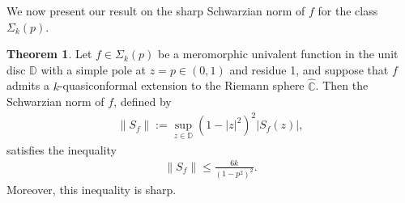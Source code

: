 \documentclass[a4paper,12pt]{amsart}
\theoremstyle{plain}
\theoremstyle{definition}
\newtheorem{thm}{Theorem}[section]
\begin{document}
We now present our result on the sharp Schwarzian norm of $f$ for the class $\Sigma_k(p)$.
\begin{thm}\label{Th-1.3}
Let $f \in \Sigma_k(p)$ be a meromorphic univalent function in the unit disc $\mathbb{D}$ with a simple pole at $z = p \in (0,1)$ and residue 1, and suppose that $f$ admits a $k$-quasiconformal extension to the Riemann sphere $\widehat{\mathbb{C}}$. Then the Schwarzian norm of $f$, defined by
\begin{align*}
	\|S_f\| := \sup_{z \in \mathbb{D}} (1 - |z|^2)^2 |S_f(z)|,
\end{align*}
satisfies the inequality
\begin{align*}
	\|S_f\| \leq \frac{6k}{(1 - p^2)^2}.
\end{align*}
Moreover, this inequality is sharp. 
\end{thm}
\end{document}
